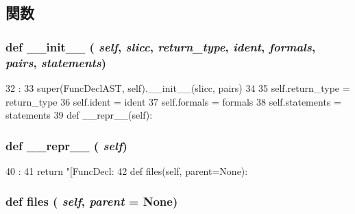 \subsection{関数}
\hypertarget{classslicc_1_1ast_1_1FuncDeclAST_1_1FuncDeclAST_ac775ee34451fdfa742b318538164070e}{
\subsubsection[{\_\-\_\-init\_\-\_\-}]{\setlength{\rightskip}{0pt plus 5cm}def \_\-\_\-init\_\-\_\- ( {\em self}, \/   {\em slicc}, \/   {\em return\_\-type}, \/   {\em ident}, \/   {\em formals}, \/   {\em pairs}, \/   {\em statements})}}
\label{classslicc_1_1ast_1_1FuncDeclAST_1_1FuncDeclAST_ac775ee34451fdfa742b318538164070e}



\begin{DoxyCode}
32                                                                              :
33         super(FuncDeclAST, self).__init__(slicc, pairs)
34 
35         self.return_type = return_type
36         self.ident = ident
37         self.formals = formals
38         self.statements = statements
39 
    def __repr__(self):
\end{DoxyCode}
\hypertarget{classslicc_1_1ast_1_1FuncDeclAST_1_1FuncDeclAST_ad8b9328939df072e4740cd9a63189744}{
\subsubsection[{\_\-\_\-repr\_\-\_\-}]{\setlength{\rightskip}{0pt plus 5cm}def \_\-\_\-repr\_\-\_\- ( {\em self})}}
\label{classslicc_1_1ast_1_1FuncDeclAST_1_1FuncDeclAST_ad8b9328939df072e4740cd9a63189744}



\begin{DoxyCode}
40                       :
41         return "[FuncDecl: %
42 
    def files(self, parent=None):
\end{DoxyCode}
\hypertarget{classslicc_1_1ast_1_1FuncDeclAST_1_1FuncDeclAST_a35b1a87f6fcbddeb5b793b0e415765f8}{
\subsubsection[{files}]{\setlength{\rightskip}{0pt plus 5cm}def files ( {\em self}, \/   {\em parent} = {\ttfamily None})}}
\label{classslicc_1_1ast_1_1FuncDeclAST_1_1FuncDeclAST_a35b1a87f6fcbddeb5b793b0e415765f8}


